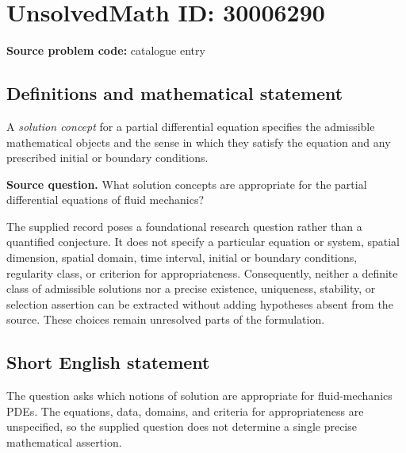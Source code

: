 \documentclass[11pt]{article}
\begin{document}
\section*{UnsolvedMath ID: 30006290}
\textbf{Source problem code:} catalogue entry
\subsection{Definitions and mathematical statement}
A \emph{solution concept} for a partial differential equation specifies the admissible mathematical objects and the sense in which they satisfy the equation and any prescribed initial or boundary conditions.

\textbf{Source question.} What solution concepts are appropriate for the partial differential equations of fluid mechanics?

The supplied record poses a foundational research question rather than a quantified conjecture. It does not specify a particular equation or system, spatial dimension, spatial domain, time interval, initial or boundary conditions, regularity class, or criterion for appropriateness. Consequently, neither a definite class of admissible solutions nor a precise existence, uniqueness, stability, or selection assertion can be extracted without adding hypotheses absent from the source. These choices remain unresolved parts of the formulation.
\subsection{Short English statement}
The question asks which notions of solution are appropriate for fluid-mechanics PDEs. The equations, data, domains, and criteria for appropriateness are unspecified, so the supplied question does not determine a single precise mathematical assertion.
\end{document}
